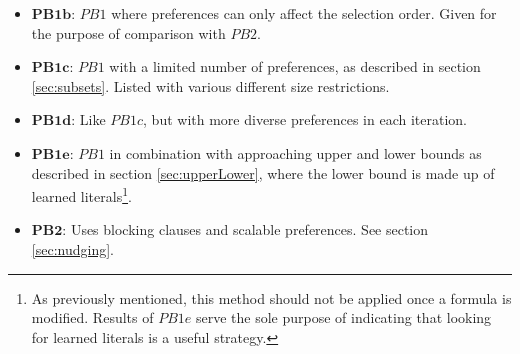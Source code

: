 \begin{itemize}
\item $\boldsymbol{PB1b}$: $PB1$ where preferences can only affect the selection order. Given for the purpose of comparison with $PB2$.
\item $\boldsymbol{PB1c}$: $PB1$ with a limited number of preferences, as described in section \ref{sec:subsets}. Listed with various different size restrictions.
\item $\boldsymbol{PB1d}$: Like $PB1c$, but with more diverse preferences in each iteration.
\item $\boldsymbol{PB1e}$: $PB1$ in combination with approaching upper and lower bounds as described in section \ref{sec:upperLower}, where the lower bound is made up of learned literals\footnote{As previously mentioned, this method should not be applied once a formula is modified. Results of $PB1e$ serve the sole purpose of indicating that looking for learned literals is a useful strategy.}.
\item $\boldsymbol{PB2}$: Uses blocking clauses and scalable preferences. See section \ref{sec:nudging}.
\end{itemize}







